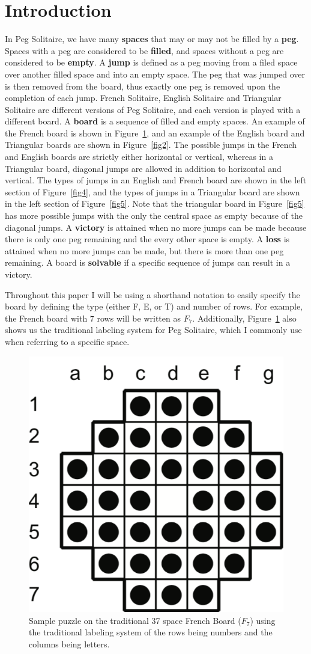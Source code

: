 \documentclass{article}
\begin{document}
\section{Introduction}
In Peg Solitaire, we have many \textbf{spaces} that may or may not be filled by a \textbf{peg}. Spaces with a peg are considered to be \textbf{filled}, and spaces without a peg are considered to be \textbf{empty}. A \textbf{jump} is defined as a peg moving from a filed space over another filled space and into an empty space. The peg that was jumped over is then removed from the board, thus exactly one peg is removed upon the completion of each jump. French Solitaire, English Solitaire and Triangular Solitaire are different versions of Peg Solitaire, and each version is played with a different board. A \textbf{board} is a sequence of filled and empty spaces. An example of the French board is shown in Figure~\ref{fig1}, and an example of the English board and Triangular boards are shown in Figure~\ref{fig2}. The possible jumps in the French and English boards are strictly either horizontal or vertical, whereas in a Triangular board, diagonal jumps are allowed in addition to horizontal and vertical. The types of jumps in an English and French board are shown in the left section of Figure~\ref{fig4}, and the types of jumps in a Triangular board are shown in the left section of Figure~\ref{fig5}. Note that the triangular board in Figure~\ref{fig5} has more possible jumps with the only the central space as empty because of the diagonal jumps. A \textbf{victory} is attained when no more jumps can be made because there is only one peg remaining and the every other space is empty. A \textbf{loss} is attained when no more jumps can be made, but there is more than one peg remaining. A board is \textbf{solvable} if a specific sequence of jumps can result in a victory.

Throughout this paper I will be using a shorthand notation to easily specify the board by defining the type (either F, E, or T) and number of rows. For example, the French board with 7 rows will be written as $F_7$. Additionally, Figure~\ref{fig1} also shows us the traditional labeling system for Peg Solitaire, which I commonly use when referring to a specific space.

\begin{figure}[htb]
\centering
\includegraphics[width  = 4.4 cm]{Figures/Figure1}
\caption{Sample puzzle on the traditional 37 space French Board ($F_7$) using the traditional labeling system of the rows being numbers and the columns being letters.}
\label{fig1}
\end{figure}
\end{document}
